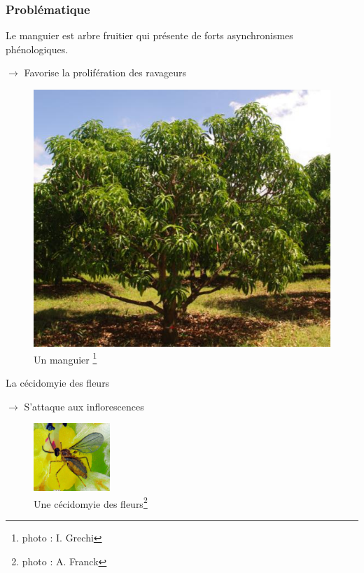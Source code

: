 \documentclass[xcolor={dvipsnames}]{beamer}
\begin{document}
\begin{frame}
 \frametitle{Problématique}
 
 
 
 \begin{multicols}{2}
 Le manguier est arbre fruitier qui présente de forts asynchronismes phénologiques.

 \vspace{0.2cm}
 
 $\rightarrow$ Favorise la prolifération des ravageurs

 \begin{figure}
 \includegraphics[scale = 0.37]{manguier.jpg}
{\scriptsize \caption{Un manguier \footnote{photo : I. Grechi}}}
 \end{figure}
\end{multicols}

\pause

 \begin{multicols}{2}
 La cécidomyie des fleurs

 \vspace{0.2cm}
 
 $\rightarrow$ S'attaque aux inflorescences

 \begin{figure}
 \includegraphics[scale = 0.8]{cecido.jpg}
\caption{Une cécidomyie des fleurs\footnote{photo : A. Franck}}
 \end{figure}

 
\end{multicols}
 
\end{frame}
\end{document}
